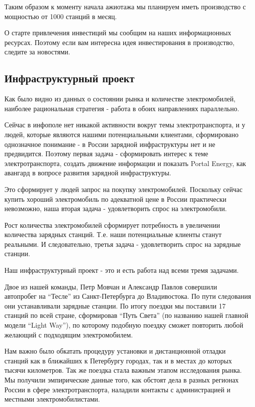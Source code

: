 \documentclass[a4paper,12pt]{report}
\begin{document}
Таким образом к моменту начала ажиотажа мы планируем иметь производство с мощностью от 1000 станций в месяц.

О старте привлечения инвестиций мы сообщим на наших информационных ресурсах. Поэтому если вам интересна идея инвестирования в производство, следите за новостями. 

\subsection{Инфраструктурный проект}

Как было видно из данных о состоянии рынка и количестве электромобилей, наиболее рациональная стратегия - работа в обоих направлениях параллельно.

Сейчас в инфополе нет никакой активности вокруг темы электротранспорта, и у людей, которые являются нашими потенциальными клиентами, сформировано однозначное понимание - в России зарядной инфраструктуры нет и не предвидится. Поэтому первая задача - сформировать интерес к теме электротранспорта, создать движение информации и показать Portal Energy, как авангард в вопросе развития зарядной инфраструктуры.

Это сформирует у людей запрос на покупку электромобилей. Поскольку сейчас купить хороший электромобиль по адекватной цене в России практически невозможно, наша вторая задача - удовлетворить спрос на электромобили. 

Рост количества электромобилей сформирует потребность в увеличении количества зарядных станций. Т.е. наши потенциальные клиенты станут реальными. И следовательно, третья задача - удовлетворить спрос на зарядные станции.

Наш инфраструктурный проект - это и есть работа над всеми тремя задачами. 

Двое из нашей команды, Петр Мовчан и Александр Павлов совершили автопробег на “Тесле” из Санкт-Петербурга до Владивостока. По пути следования они устанавливали зарядные станции. По итогу поездки мы поставили 17 станций по всей стране, сформировав “Путь Света” (по названию нашей главной модели “Light Way”), по которому подобную поездку сможет повторить любой желающий с подходящим электромобилем. 

Нам важно было обкатать процедуру установки и дистанционной отладки станций как в ближайших к Петербургу городах, так и в местах до которых тысячи километров. Так же поездка стала важным этапом исследования рынка. Мы получили эмпирические данные того, как обстоят дела в разных регионах России в сфере электротранспорта, наладили контакты с администрацией и местными электромобилистами. 
\end{document}
